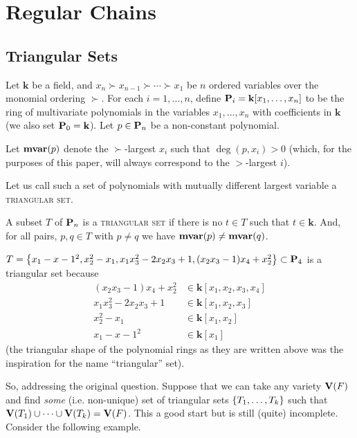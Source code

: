 \documentclass[12pt]{article}
\newcommand{\kk}{\mathbf{k}}
\begin{document}
\section{Regular Chains}


\subsection{Triangular Sets}

Let $\kk$ be a field, and $x_n \succ x_{n-1} \succ \cdots \succ x_1$ be $n$ ordered variables over the monomial ordering $\succ$. For each $i=1,\ldots,n$, define $\PP_i=\kk[x_1,\ldots,x_n]$ to be the ring of multivariate polynomials in the variables $x_1, \ldots, x_n$ with coefficients in $\kk$ (we also set $\PP_0 = \kk$). Let $p\in \mathbf{P}_n$ be a non-constant polynomial.

Let $\textbf{mvar}(p)$ denote the $\succ$-largest $x_i$ such that $\deg(p,x_i)>0$ (which, for the purposes of this paper, will always correspond to the $>$-largest $i$).


Let us call such a set of polynomials with mutually different largest variable a \textsc{triangular set}.


\begin{definition}
A subset $T$ of $\mathbf{P}_n$ is a \textsc{triangular set} if there is no $t \in T$ such that $t \in \kk$. And, for all pairs, $p,q \in T$ with $p \neq q$ we have $\textbf{mvar}(p) \neq \textbf{mvar}(q)$.
\end{definition}



\begin{example} $T = \left\{ x_1-x-1^2,x_2^2 - x_1, x_1x_3^2 - 2x_2x_3+1, (x_2x_3-1)x_4+x_2^2 \right\} \subset \mathbf{P}_4$ is a triangular set because
\begin{align*}
(x_2x_3-1)x_4+x_2^2		&\in \kk[x_1,x_2,x_3,x_4] \\
x_1x_3^2 - 2x_2x_3+1		&\in \kk[x_1,x_2,x_3] \\
x_2^2 - x_1				&\in \kk[x_1,x_2] \\
x_1-x-1^2				&\in \kk[x_1]
\end{align*}
(the triangular shape of the polynomial rings as they are written above was the inspiration for the name ``triangular'' set).
\end{example}

So, addressing the original question. Suppose that we can take any variety $\mathbf{V}(F)$ and find \emph{some} (i.e. non-unique) set of triangular sets $\left\{ T_1,\ldots,T_k \right\}$ such that $\mathbf{V}(T_1) \cup \cdots \cup \mathbf{V}(T_k) = \mathbf{V}(F)$. This a good start but is still (quite) incomplete. Consider the following example.
\end{document}
